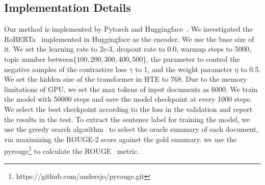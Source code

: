 \documentclass[11pt]{article}
\begin{document}
\subsection{Implementation Details}
\label{imp}
Our method is implemented by Pytorch and Huggingface~\cite{wolf2020transformers}. 
We investigated the RoBERTa~\cite{liu2019roberta} implemented in Huggingface as the encoder. 
We use the base size of it.
We set the learning rate to 2e-3, dropout rate to 0.0, warmup steps to 5000, topic number between$\{100,200,300,400,500\}$, the parameter to control the negative samples of the contrastive loss $\gamma$ to 1, and the weight parameter $\eta$ to 0.5. 
We set the hidden size of the transformer in HTE to 768.
Due to the memory limitations of GPU, we set the max tokens of input documents as 6000.
We train the model with 50000 steps and save the model checkpoint at every 1000 steps. 
We select the best checkpoint according to the loss in the validation and report the results in the test. 
To extract the sentence label for training the model, we use the greedy search algorithm~\cite{nallapati2017summarunner} to select the oracle summary of each document, via maximizing the ROUGE-2 score against the gold summary.
we use the pyrouge\footnote{https://github.com/andersjo/pyrouge.git} to calculate the ROUGE~\cite{lin2004rouge} metric.
\end{document}
